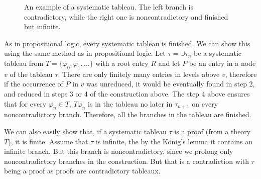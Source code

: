 \begin{figure}[t]
\centering
{}
\caption{An example of a systematic tableau. The left branch is contradictory, while the right one is noncontradictory and finished but infinite.}
\label{fig:tableau_systematic}
\end{figure}


As in propositional logic, every systematic tableau is finished. We can show this using the same method as in propositional logic. Let $\tau = \cup \tau_n$ be a systematic tableau from $T = \{\varphi_0, \varphi_1, \dots\}$ with a root entry $R$ and let $P$ be an entry in a node $v$ of the tableau $\tau$. There are only finitely many entries in levels above $v$, therefore if the occurrence of $P$ in $v$ was unreduced, it would be eventually found in step 2, and reduced in steps 3 or 4 of the construction above. The step 4 above ensures that for every $\varphi_n \in T$, $T \varphi_n$ is in the tableau no later in $\tau_{n+1}$ on every noncontradictory branch. Therefore, all the branches in the tableau are finished.

We can also easily show that, if a systematic tableau $\tau$ is a proof (from a theory $T$), it is finite. Assume that $\tau$ is infinite, the by the König's lemma it contains an infinite branch. But this branch is noncontradictory, since we prolong only noncontradictory branches in the construction. But that is a contradiction with $\tau$ being a proof as proofs are contradictory tableaux.

